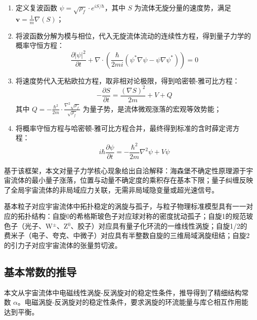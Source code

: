 \documentclass[aps,prd,preprint,superscriptaddress,floatfix,numbers,sort&compress]{revtex4-2}
\begin{document}
\begin{enumerate}
    \item 定义复波函数 $\psi=\sqrt{\rho_{f}} \cdot e^{i S / \hbar}$，其中 $S$ 为流体无旋分量的速度势，满足 $\boldsymbol{v}=\frac{1}{m} \nabla(S)$；
    \item 将波函数分解为模与相位，代入无旋流体流动的连续性方程，得到量子力学的概率守恒方程：
    \begin{equation}
    \frac{\partial|\psi|^{2}}{\partial t}+\nabla \cdot\left(\frac{\hbar}{2 m i}\left(\psi^{*} \nabla \psi-\psi \nabla \psi^{*}\right)\right)=0
    \label{eq:probability_conservation}
    \end{equation}
    \item 将速度势代入无粘欧拉方程，取非相对论极限，得到哈密顿-雅可比方程：
    \begin{equation}
    -\frac{\partial S}{\partial t}=\frac{(\nabla S)^{2}}{2 m}+V+Q
    \label{eq:hamilton_jacobi}
    \end{equation}
    其中 $Q=-\frac{\hbar^{2}}{2 m} \cdot \frac{\nabla^{2} \sqrt{\rho_{f}}}{\sqrt{\rho_{f}}}$ 为量子势，是流体微观涨落的宏观等效势能；
    \item 将概率守恒方程与哈密顿-雅可比方程合并，最终得到标准的含时薛定谔方程：
    \begin{equation}
    i \hbar \frac{\partial \psi}{\partial t}=-\frac{\hbar^{2}}{2 m} \nabla^{2} \psi+V \psi
    \label{eq:schrodinger}
    \end{equation}
\end{enumerate}

基于该框架，本文对量子力学核心现象给出自洽解释：海森堡不确定性原理源于宇宙流体的最小量子涨落，位置与动量不确定度的乘积存在基本下限；量子纠缠反映了全局宇宙流体的非局域应力关联，无需非局域隐变量或超光速信号。

基本粒子对应宇宙流体中拓扑稳定的涡旋与孤子，与粒子物理标准模型具有一一对应的拓扑结构：自旋0的希格斯玻色子对应球对称的密度扰动孤子；自旋1的规范玻色子（光子、W$^\pm$、Z$^0$、胶子）对应具有量子化环流的一维线性涡旋；自旋1/2的费米子（电子、夸克、中微子）对应具有半整数自旋的三维局域涡旋纽结；自旋2的引力子对应宇宙流体的张量剪切波。

\subsection{基本常数的推导}
本文从宇宙流体中电磁线性涡旋-反涡旋对的稳定性条件，推导得到了精细结构常数 $\alpha$。电磁涡旋-反涡旋对的稳定性条件，要求涡旋的环流能量与库仑相互作用能达到平衡。
\end{document}
